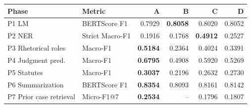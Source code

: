 \begin{tabular}{llrrrr}
\toprule
Phase & Metric & A & B & C & D \\
\midrule
P1 LM & BERTScore F1 & 0.7929 & \textbf{0.8058} & 0.8020 & 0.8052 \\
P2 NER & Strict Macro-F1 & 0.1916 & 0.1768 & \textbf{0.4912} & 0.2527 \\
P3 Rhetorical roles & Macro-F1 & \textbf{0.5184} & 0.2364 & 0.4024 & 0.3391 \\
P4 Judgment pred. & Macro-F1 & \textbf{0.6795} & 0.4908 & 0.5920 & 0.5269 \\
P5 Statutes & Macro-F1 & \textbf{0.3037} & 0.2196 & 0.2632 & 0.2730 \\
P6 Summarization & BERTScore F1 & \textbf{0.8354} & 0.8093 & 0.8161 & 0.8142 \\
P7 Prior case retrieval & Micro-F1@7 & \textbf{0.2534} & -- & 0.1796 & 0.1807 \\
\bottomrule
\end{tabular}
